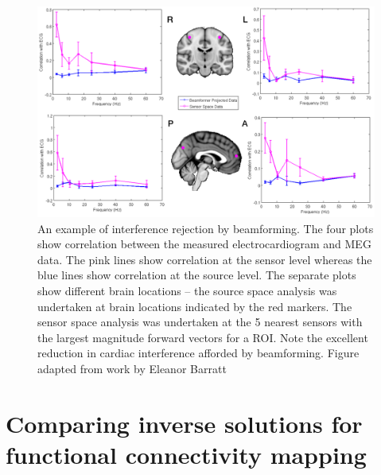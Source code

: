 \begin{figure}[h!]
	\begin{centering}
		\includegraphics[width=\textwidth]{./images/chapter2/beamformer_reject.png}
		\caption{An example of interference rejection by beamforming. The four plots show correlation between the measured electrocardiogram and MEG data. The pink lines show correlation at the sensor level whereas the blue lines show correlation at the source level. The separate plots show different brain locations – the source space analysis was undertaken at brain locations indicated by the red markers. The sensor space analysis was undertaken at the 5 nearest sensors with the largest magnitude forward vectors  for a ROI. Note the excellent reduction in cardiac interference afforded by beamforming. Figure adapted from work by Eleanor Barratt \citep{ONeill2015b}}
		\label{fig_bf_reject}
	\end{centering}
\end{figure}

\clearpage
\section{Comparing inverse solutions for functional connectivity mapping}\label{sec_bf_v_mn}

